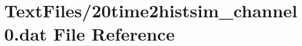 \hypertarget{20time2histsim__channel0_8dat}{}\section{Text\+Files/20time2histsim\+\_\+channel0.dat File Reference}
\label{20time2histsim__channel0_8dat}
